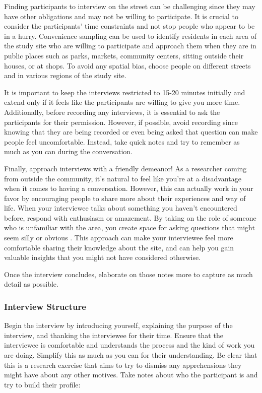 \documentclass[
]{latex/krantz}
\begin{document}
Finding participants to interview on the street can be challenging since they may have other obligations and may not be willing to participate. It is crucial to consider the participants' time constraints and not stop people who appear to be in a hurry. Convenience sampling can be used to identify residents in each area of the study site who are willing to participate and approach them when they are in public places such as parks, markets, community centers, sitting outside their houses, or at shops. To avoid any spatial bias, choose people on different streets and in various regions of the study site.

It is important to keep the interviews restricted to 15-20 minutes initially and extend only if it feels like the participants are willing to give you more time. Additionally, before recording any interviews, it is essential to ask the participants for their permission. However, if possible, avoid recording since knowing that they are being recorded or even being asked that question can make people feel uncomfortable. Instead, take quick notes and try to remember as much as you can during the conversation.

Finally, approach interviews with a friendly demeanor! As a researcher coming from outside the community, it's natural to feel like you're at a disadvantage when it comes to having a conversation. However, this can actually work in your favor by encouraging people to share more about their experiences and way of life. When your interviewee talks about something you haven't encountered before, respond with enthusiasm or amazement. By taking on the role of someone who is unfamiliar with the area, you create space for asking questions that might seem silly or obvious \autocite{chiswellLongYouRe2016}. This approach can make your interviewee feel more comfortable sharing their knowledge about the site, and can help you gain valuable insights that you might not have considered otherwise.

Once the interview concludes, elaborate on those notes more to capture as much detail as possible.

\hypertarget{interview-structure}{%
\subsubsection{Interview Structure}\label{interview-structure}}

Begin the interview by introducing yourself, explaining the purpose of the interview, and thanking the interviewee for their time. Ensure that the interviewee is comfortable and understands the process and the kind of work you are doing. Simplify this as much as you can for their understanding. Be clear that this is a research exercise that aims to try to dismiss any apprehensions they might have about any other motives. Take notes about who the participant is and try to build their profile:
\end{document}
